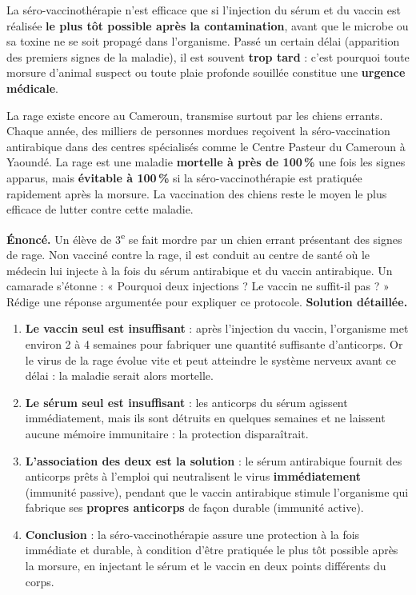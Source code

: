 \documentclass[11pt]{article}
\newcounter{popsec}
\newcounter{popsub}
\newcommand{\courssub}[1]{%
  \stepcounter{popsub}%
  \par\vspace{9pt}\noindent{\popxbold\fontsize{11.5}{13}\selectfont\color{popink}{\color{poporange}\thepopsec.\thepopsub}\hspace{6pt}#1}\par\nopagebreak\vspace{4pt}
}
\begin{document}
\courssub{Condition d'efficacité}

\begin{propriete}
La séro-vaccinothérapie n'est efficace que si l'injection du sérum et du vaccin est réalisée \textbf{le plus tôt possible après la contamination}, avant que le microbe ou sa toxine ne se soit propagé dans l'organisme. Passé un certain délai (apparition des premiers signes de la maladie), il est souvent \textbf{trop tard} : c'est pourquoi toute morsure d'animal suspect ou toute plaie profonde souillée constitue une \textbf{urgence médicale}.
\end{propriete}

\begin{savaistu}
La rage existe encore au Cameroun, transmise surtout par les chiens errants. Chaque année, des milliers de personnes mordues reçoivent la séro-vaccination antirabique dans des centres spécialisés comme le Centre Pasteur du Cameroun à Yaoundé. La rage est une maladie \textbf{mortelle à près de 100\,\%} une fois les signes apparus, mais \textbf{évitable à 100\,\%} si la séro-vaccinothérapie est pratiquée rapidement après la morsure. La vaccination des chiens reste le moyen le plus efficace de lutter contre cette maladie.
\end{savaistu}

\begin{exoresolu}
\textbf{Énoncé.} Un élève de 3\textsuperscript{e} se fait mordre par un chien errant présentant des signes de rage. Non vacciné contre la rage, il est conduit au centre de santé où le médecin lui injecte à la fois du sérum antirabique et du vaccin antirabique. Un camarade s'étonne : « Pourquoi deux injections ? Le vaccin ne suffit-il pas ? » Rédige une réponse argumentée pour expliquer ce protocole.
\tcblower
\textbf{Solution détaillée.}
\begin{enumerate}
\item \textbf{Le vaccin seul est insuffisant} : après l'injection du vaccin, l'organisme met environ 2 à 4 semaines pour fabriquer une quantité suffisante d'anticorps. Or le virus de la rage évolue vite et peut atteindre le système nerveux avant ce délai : la maladie serait alors mortelle.
\item \textbf{Le sérum seul est insuffisant} : les anticorps du sérum agissent immédiatement, mais ils sont détruits en quelques semaines et ne laissent aucune mémoire immunitaire : la protection disparaîtrait.
\item \textbf{L'association des deux est la solution} : le sérum antirabique fournit des anticorps prêts à l'emploi qui neutralisent le virus \textbf{immédiatement} (immunité passive), pendant que le vaccin antirabique stimule l'organisme qui fabrique ses \textbf{propres anticorps} de façon durable (immunité active).
\item \textbf{Conclusion} : la séro-vaccinothérapie assure une protection à la fois immédiate et durable, à condition d'être pratiquée le plus tôt possible après la morsure, en injectant le sérum et le vaccin en deux points différents du corps.
\end{enumerate}
\end{exoresolu}
\end{document}
